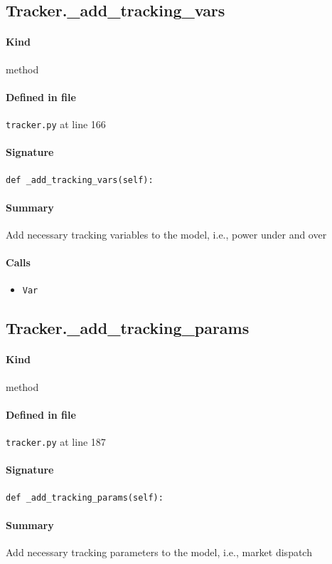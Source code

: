 \documentclass[11pt]{report}
\begin{document}
\subsection{Tracker.\_add\_tracking\_vars}
\label{def:tracker.py:Tracker._add_tracking_vars:L166}
\paragraph{Kind} method
\paragraph{Defined in file} \texttt{tracker.py} at line 166
\paragraph{Signature} \texttt{def \_add\_tracking\_vars(self):}
\paragraph{Summary} Add necessary tracking variables to the model, i.e., power under and over
\paragraph{Calls}
\begin{itemize}[leftmargin=*]
  \item \texttt{Var}
\end{itemize}
\subsection{Tracker.\_add\_tracking\_params}
\label{def:tracker.py:Tracker._add_tracking_params:L187}
\paragraph{Kind} method
\paragraph{Defined in file} \texttt{tracker.py} at line 187
\paragraph{Signature} \texttt{def \_add\_tracking\_params(self):}
\paragraph{Summary} Add necessary tracking parameters to the model, i.e., market dispatch
\end{document}
